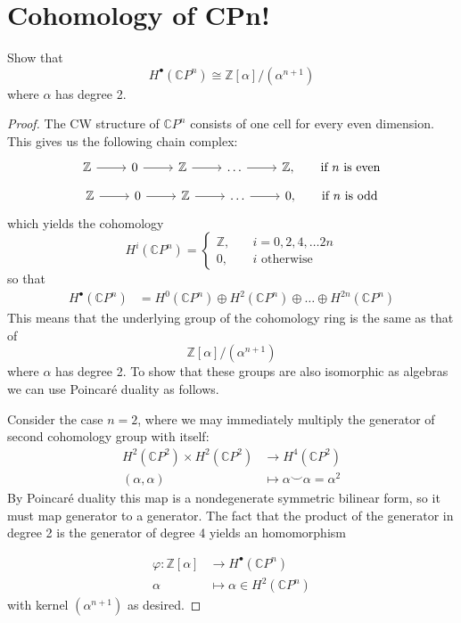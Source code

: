 \section{Cohomology of CPn!}
	\begin{exercise}
	Show that
	\[H^\bullet(\mathbb{C} P^n)\cong \mathbb{Z}[\alpha]/(\alpha^{n+1})\]
	where $\alpha$ has degree 2.
\end{exercise}
\begin{proof}
	The CW structure of $\mathbb{C} P^n$ consists of one cell for every even dimension. This gives us the following chain complex:
	\[\begin{tikzcd}
		\mathbb{Z}\arrow[r]&0\arrow[r]&\mathbb{Z}\arrow[r]&\ldots\arrow[r]&\mathbb{Z},\qquad\text{if }n\text{ is even}
	\end{tikzcd}\]
	\[\begin{tikzcd}
		\mathbb{Z}\arrow[r]&0\arrow[r]&\mathbb{Z}\arrow[r]&\ldots\arrow[r]&0,\qquad\text{if }n\text{ is odd}
	\end{tikzcd}\]
	which yields the cohomology
	\[H^i(\mathbb{C} P^n)=\begin{cases}
		\mathbb{Z},\quad&i=0,2,4,\ldots 2n\\
		0,\quad&i\text{ otherwise}
	\end{cases}\]
	so that
	\begin{align*}
		H^\bullet(\mathbb{C} P^n)&=H^0(\mathbb{C} P^n)\oplus H^2(\mathbb{C} P^n)\oplus\ldots\oplus H^{2n}(\mathbb{C} P^{n})
	\end{align*}
	This means that the underlying group of the cohomology ring is the same as that of
	\[\mathbb{Z}[\alpha]/(\alpha^{n+1})\]
	where $\alpha$ has degree 2. To show that these groups are also isomorphic as algebras we can use Poincar\'e duality as follows.
	
	Consider the case $n=2$, where we may immediately multiply the generator of second cohomology group with itself:
	\begin{align*}
		H^2(\mathbb{C} P^2)\times H^2(\mathbb{C} P^2)&\to H^4(\mathbb{C} P^2)\\
		(\alpha,\alpha)\qquad\quad&\mapsto\alpha\smile\alpha =\alpha^2
	\end{align*}
	By Poincar\'e duality this map is a nondegenerate symmetric bilinear form, so it must map generator to a generator. {\color{blue-violet}The fact that the product of the generator in degree 2 is the generator of degree 4} yields an homomorphism

	\begin{align*}
		\varphi:\mathbb{Z}[\alpha]&\to H^\bullet(\mathbb{C} P^n)\\
		\alpha&\mapsto\alpha\in H^2(\mathbb{C} P^n)
	\end{align*}
	with kernel $(\alpha^{n+1})$ as desired.
	

\end{proof}
